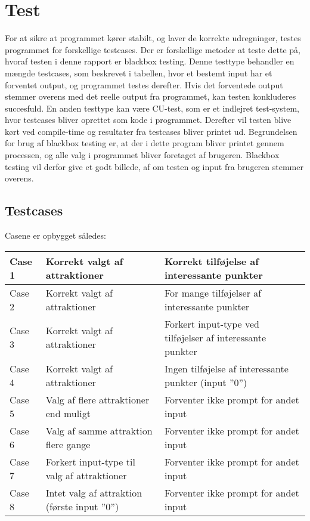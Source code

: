 \chapter{Test}
For at sikre at programmet kører stabilt, og laver de korrekte udregninger, testes programmet for forskellige testcases. Der er forskellige metoder at teste dette på, hvoraf testen i denne rapport er blackbox testing. Denne testtype behandler en mængde testcases, som beskrevet i tabellen, hvor et bestemt input har et forventet output, og programmet testes derefter. Hvis det forventede output stemmer overens med det reelle output fra programmet, kan testen konkluderes succesfuld. 
En anden testtype kan være CU-test, som er et indlejret test-system, hvor testcases bliver oprettet som kode i programmet. Derefter vil testen blive kørt ved compile-time og resultater fra testcases bliver printet ud. Begrundelsen for brug af blackbox testing er, at der i dette program bliver printet gennem processen, og alle valg i programmet bliver foretaget af brugeren. Blackbox testing vil derfor give et godt billede, af om testen og input fra brugeren stemmer overens.

\section{Testcases}
Casene er opbygget således:\newline
\begin{tabular}{|l|l| p{5cm}|}
	\hline
	Case 1 & Korrekt valgt af attraktioner & Korrekt tilføjelse af interessante punkter \\ \hline
	Case 2 & Korrekt valgt af attraktioner & For mange tilføjelser af interessante punkter \\ \hline
	Case 3 & Korrekt valgt af attraktioner & Forkert input-type ved tilføjelser af interessante punkter\\ \hline
	Case 4 & Korrekt valgt af attraktioner & Ingen tilføjelse af interessante punkter (input ”0”) \\ \hline
	Case 5 & Valg af flere attraktioner end muligt & Forventer ikke prompt for andet input\\ \hline
	Case 6 & Valg af samme attraktion flere gange &	Forventer ikke prompt for andet input\\ \hline
	Case 7 & Forkert input-type til valg af attraktioner & Forventer ikke prompt for andet input\\ \hline
	Case 8 & Intet valg af attraktion (første input ”0”) & Forventer ikke prompt for andet input\\ \hline
\end{tabular} 
\newline

